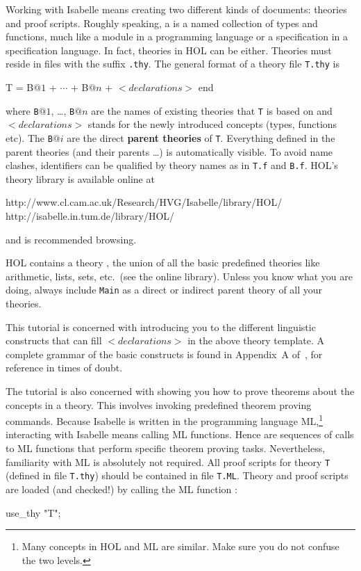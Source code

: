 Working with Isabelle means creating two different kinds of documents:
theories and proof scripts. Roughly speaking, a  is a named
collection of types and functions, much like a module in a programming
language or a specification in a specification language. In fact, theories in
HOL can be either. Theories must reside in files with the suffix
\texttt{.thy}. The general format of a theory file \texttt{T.thy} is
\begin{ttbox}
T = B\(@1\) + \(\cdots\) + B\(@n\) +
\({<}declarations{>}\)
end
\end{ttbox}
where \texttt{B}$@1$, \dots, \texttt{B}$@n$ are the names of existing
theories that \texttt{T} is based on and ${<}declarations{>}$ stands for the
newly introduced concepts (types, functions etc). The \texttt{B}$@i$ are the
direct \textbf{parent theories} of \texttt{T}.
Everything defined in the parent theories (and their parents \dots) is
automatically visible. To avoid name clashes, identifiers can be qualified by
theory names as in \texttt{T.f} and \texttt{B.f}. HOL's theory library is
available online at
\begin{ttbox}
http://www.cl.cam.ac.uk/Research/HVG/Isabelle/library/HOL/
http://isabelle.in.tum.de/library/HOL/
\end{ttbox}
and is recommended browsing.
\begin{warn}
  HOL contains a theory , the union of all the basic
  predefined theories like arithmetic, lists, sets, etc.\ (see the online
  library).  Unless you know what you are doing, always include \texttt{Main}
  as a direct or indirect parent theory of all your theories.
\end{warn}

This tutorial is concerned with introducing you to the different linguistic
constructs that can fill ${<}declarations{>}$ in the above theory template.
A complete grammar of the basic constructs is found in Appendix~A
of~\cite{Isa-Ref-Man}, for reference in times of doubt.

The tutorial is also concerned with showing you how to prove theorems about
the concepts in a theory. This involves invoking predefined theorem proving
commands. Because Isabelle is written in the programming language
ML,\footnote{Many concepts in HOL and ML are similar. Make sure you do not
  confuse the two levels.} interacting with Isabelle means calling ML
functions. Hence  are sequences of calls to ML
functions that perform specific theorem proving tasks. Nevertheless,
familiarity with ML is absolutely not required.  All proof scripts for theory
\texttt{T} (defined in file \texttt{T.thy}) should be contained in file
\texttt{T.ML}. Theory and proof scripts are loaded (and checked!) by calling
the ML function :
\begin{ttbox}
use_thy "T";
\end{ttbox}

